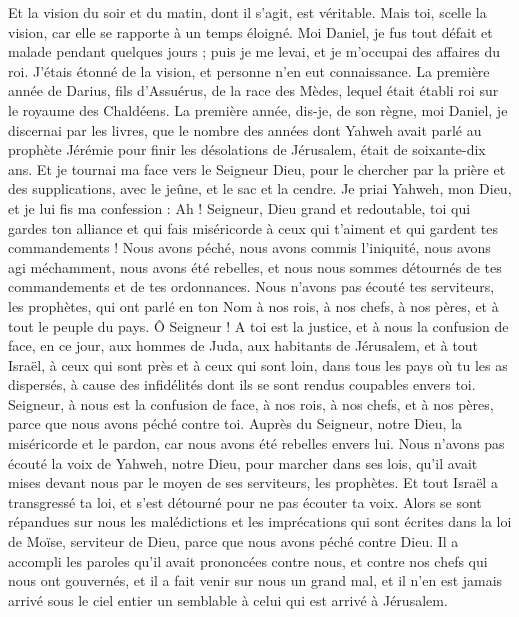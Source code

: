 \begin{multicols}{2}
Et la vision du soir et du matin, dont il s'agit, est véritable. Mais toi, scelle la vision, car elle se rapporte à un temps éloigné.
Moi Daniel, je fus tout défait et malade pendant quelques jours ; puis je me levai, et je m'occupai des affaires du roi. J'étais étonné de la vision, et personne n'en eut connaissance.
\VerseOne{}La première année de Darius, fils d'Assuérus, de la race des Mèdes, lequel était établi roi sur le royaume des Chaldéens.
La première année, dis-je, de son règne, moi Daniel, je discernai par les livres, que le nombre des années dont Yahweh avait parlé au prophète Jérémie pour finir les désolations de Jérusalem, était de soixante-dix ans. 
Et je tournai ma face vers le Seigneur Dieu, pour le chercher par la prière et des supplications, avec le jeûne, et le sac et la cendre.
Je priai Yahweh, mon Dieu, et je lui fis ma confession : Ah ! Seigneur, Dieu grand et redoutable, toi qui gardes ton alliance et qui fais miséricorde à ceux qui t'aiment et qui gardent tes commandements !
Nous avons péché, nous avons commis l'iniquité, nous avons agi méchamment, nous avons été rebelles, et nous nous sommes détournés de tes commandements et de tes ordonnances.
Nous n'avons pas écouté tes serviteurs, les prophètes, qui ont parlé en ton Nom à nos rois, à nos chefs, à nos pères, et à tout le peuple du pays.
Ô Seigneur ! A toi est la justice, et à nous la confusion de face, en ce jour, aux hommes de Juda, aux habitants de Jérusalem, et à tout Israël, à ceux qui sont près et à ceux qui sont loin, dans tous les pays où tu les as dispersés, à cause des infidélités dont ils se sont rendus coupables envers toi.
Seigneur, à nous est la confusion de face, à nos rois, à nos chefs, et à nos pères, parce que nous avons péché contre toi.
Auprès du Seigneur, notre Dieu, la miséricorde et le pardon, car nous avons été rebelles envers lui.
Nous n'avons pas écouté la voix de Yahweh, notre Dieu, pour marcher dans ses lois, qu'il avait mises devant nous par le moyen de ses serviteurs, les prophètes.
Et tout Israël a transgressé ta loi, et s'est détourné pour ne pas écouter ta voix. Alors se sont répandues sur nous les malédictions et les imprécations qui sont écrites dans la loi de Moïse, serviteur de Dieu, parce que nous avons péché contre Dieu.
Il a accompli les paroles qu'il avait prononcées contre nous, et contre nos chefs qui nous ont gouvernés, et il a fait venir sur nous un grand mal, et il n'en est jamais arrivé sous le ciel entier un semblable à celui qui est arrivé à Jérusalem.

\end{multicols}
